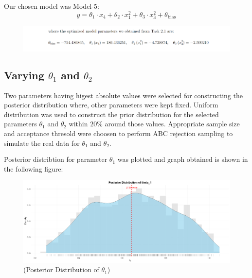 \documentclass[12pt,a4paper]{article}
\begin{document}
Our chosen model was Model-5: 
\[y = \theta_1 \cdot x_4 + \theta_2 \cdot x_1^2 + \theta_3 \cdot x_3^2 + \theta_{\text{bias}}\]

\begin{figure}[H]
  \centering
  \includegraphics[width=\textwidth]{t1.png}
\end{figure}

\subsection*{Varying $\theta_1$ and $\theta_2$}

Two parameters having higest absolute values were selected for constructing the
posterior distribution where, other parameters were kept fixed. 
Uniform distribution was used to construct the prior distribution for the selected parameters 
$\theta_1$ and $\theta_2$ within $20\%$ around those values. Appropriate sample size and acceptance thresold were choosen to perform ABC rejection sampling  
to simulate the real data for $\theta_1$ and $\theta_2$. 

Posterior distribtion for parameter $\theta_1$ was
plotted and graph obtained is shown in the 
following figure:

\begin{figure}[H]
  \centering
  \includegraphics[width=\textwidth]{m7.png}
  \caption{(Posterior Distribution of $\theta_1$)}
  \label{fig:Posterior Distribution of theta_1}
\end{figure}
\end{document}
